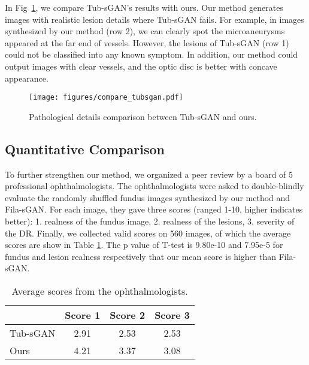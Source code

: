 \documentclass[letterpaper]{article} %
\begin{document}
    In Fig~\ref{fig:compare_tubsgan}, we compare Tub-sGAN's results with ours. Our method generates images with realistic lesion details where Tub-sGAN fails. For example, in images synthesized by our method (row 2), we can clearly spot the microaneurysms appeared at the far end of vessels. However, the lesions of Tub-sGAN (row 1) could not be classified into any known symptom. In addition, our method could output images with clear vessels, and the optic disc is better with concave appearance.

	\begin{figure}[t]
		\begin{center}
			\texttt{[image: figures/compare\_tubsgan.pdf]}
		\end{center}
		\caption{Pathological details comparison between Tub-sGAN and ours. }
		\label{fig:compare_tubsgan}
	\end{figure}

	\subsection{Quantitative Comparison}

	To further strengthen our method, we organized a peer review by a board of 5 professional ophthalmologists. The ophthalmologists were asked to double-blindly evaluate the randomly shuffled fundus images synthesized by our method and Fila-sGAN. For each image, they gave three scores (ranged 1-10, higher indicates better): 1. realness of the fundus image, 2. realness of the lesions, 3. severity of the DR. Finally, we collected valid scores on 560 images, of which the average scores are show in Table \ref{tab:quantitative_comparison}. The p value of T-test is 9.80e-10 and 7.95e-5 for fundus and lesion realness respectively that our mean score is higher than Fila-sGAN.

	\begin{table}[h!]
		\begin{center}
			\begin{tabularx}{0.8\columnwidth}{Xccc}
				\hline
				& Score 1 & Score 2 & Score 3 \\ \hline
				Tub-sGAN & 2.91 & 2.53 & 2.53 \\
				Ours & 4.21 & 3.37 & 3.08 \\ \hline
			\end{tabularx}
		\end{center}
		\caption{Average scores from the ophthalmologists.}
		\label{tab:quantitative_comparison}
	\end{table}
\end{document}
